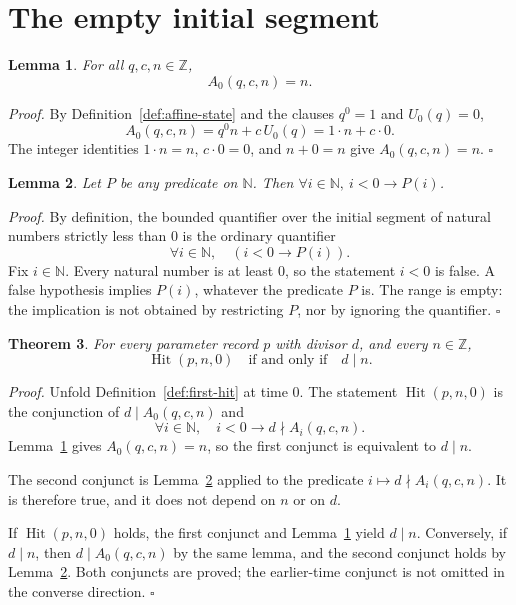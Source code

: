 \documentclass[11pt,letterpaper]{article}
\newcommand{\N}{\mathbb{N}}
\newcommand{\Z}{\mathbb{Z}}
\newtheorem{theorem}{Theorem}
\newtheorem{lemma}[theorem]{Lemma}
\newenvironment{proof}{\noindent\textit{Proof.}}{\hfill\(\square\)}
\begin{document}
\section{The empty initial segment}

\begin{lemma}
\label{lem:affine-zero}
For all \(q,c,n\in\Z\),
\[
A_0(q,c,n)=n.
\]
\end{lemma}

\begin{proof}
By Definition~\ref{def:affine-state} and the clauses \(q^0=1\) and \(U_0(q)=0\),
\[
A_0(q,c,n)=q^0 n+c\,U_0(q)=1\cdot n+c\cdot 0.
\]
The integer identities \(1\cdot n=n\), \(c\cdot 0=0\), and \(n+0=n\) give
\(A_0(q,c,n)=n\).
\end{proof}

\begin{lemma}
\label{lem:no-earlier}
Let \(P\) be any predicate on \(\N\). Then \(\forall i\in\N,\ i<0\rightarrow P(i)\).
\end{lemma}

\begin{proof}
By definition, the bounded quantifier over the initial segment of natural
numbers strictly less than \(0\) is the ordinary quantifier
\[
\forall i\in\N,\quad (i<0\rightarrow P(i)).
\]
Fix \(i\in\N\). Every natural number is at least \(0\), so the statement
\(i<0\) is false. A false hypothesis implies \(P(i)\), whatever the predicate
\(P\) is. The range is empty: the implication is not obtained by restricting
\(P\), nor by ignoring the quantifier.
\end{proof}

\begin{theorem}
\label{thm:first-hit-zero}
For every parameter record \(p\) with divisor \(d\), and every \(n\in\Z\),
\[
\operatorname{Hit}(p,n,0)\quad\text{if and only if}\quad d\mid n.
\]
\end{theorem}

\begin{proof}
Unfold Definition~\ref{def:first-hit} at time \(0\). The statement
\(\operatorname{Hit}(p,n,0)\) is the conjunction of \(d\mid A_0(q,c,n)\) and
\[
\forall i\in\N,\quad i<0\rightarrow d\nmid A_i(q,c,n).
\]
Lemma~\ref{lem:affine-zero} gives \(A_0(q,c,n)=n\), so the first conjunct is
equivalent to \(d\mid n\).

The second conjunct is Lemma~\ref{lem:no-earlier} applied to the predicate
\(i\mapsto d\nmid A_i(q,c,n)\). It is therefore true, and it does not depend
on \(n\) or on \(d\).

If \(\operatorname{Hit}(p,n,0)\) holds, the first conjunct and
Lemma~\ref{lem:affine-zero} yield \(d\mid n\). Conversely, if \(d\mid n\), then
\(d\mid A_0(q,c,n)\) by the same lemma, and the second conjunct holds by
Lemma~\ref{lem:no-earlier}. Both conjuncts are proved; the earlier-time
conjunct is not omitted in the converse direction.
\end{proof}
\end{document}
